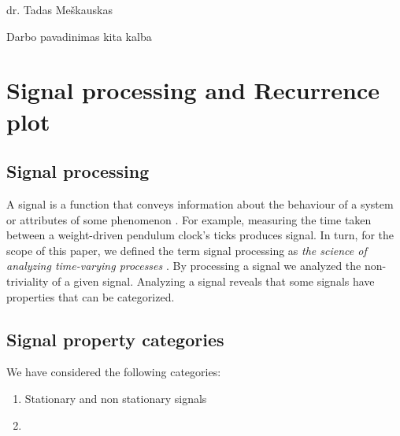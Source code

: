 \documentclass[a4paper,12pt,fleqn]{article}
\begin{document}
{}{}{}{}%
{dr. Tadas Meškauskas}

\tableofcontents



\bothabstracts{}%
{Darbo pavadinimas kita kalba} %
{}%






\newpage

\section{Signal processing and Recurrence plot}
\label{sec:motivation}
\subsection{Signal processing}

A signal is a function that conveys information about the behaviour of a system
or attributes of some phenomenon \cite{priemer1990introductory}.
For example, measuring the time taken between a weight-driven
pendulum clock's ticks produces signal.
In turn, for the scope of this paper, we defined the term signal processing as
\textit{the science of analyzing time-varying processes} 
\cite{lyons2004understanding}.
By processing a signal we analyzed the non-triviality of a given signal.
Analyzing a signal reveals that some signals 
have properties that can be categorized.

\subsection{Signal property categories}


We have considered the following categories:
\begin{enumerate}
  \item Stationary and non stationary signals
  \item 
\end{enumerate}
\end{document}
